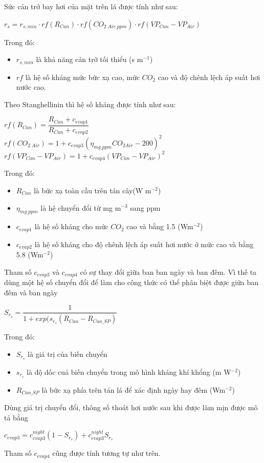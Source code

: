 \documentclass[a4paper]{article}
\begin{document}
    Sức cản trở bay hơi của mặt trên lá được tính như sau:
    \begin{center}
        $r_s = r_{s, min} \cdot rf(R_{Can}) \cdot rf(CO_{2\;Air\_ppm}) \cdot 
        rf(VP_{Can} - VP_{Air})$
    \end{center}
    Trong đó:
    \begin{itemize}
        \item $r_{s, min}$ là khả năng cản trở tối thiểu  (s m$^{-1}$)
        \item $rf$ là hệ số kháng mức bức xạ cao, mức $CO_2$ cao và độ chênh lệch áp suất hơi nước cao.
    \end{itemize}
    
    Theo Stanghellinin thì hệ số kháng được tính như sau:
    \begin{center}
        $rf(R_{Can}) = \dfrac{R_{Can} + c_{evap1}}{R_{Can} + c_{evap2}}$\\
        $rf(CO_{2\;Air}) = 1 + c_{evap3}(\eta_{mg\_ppm}CO_{2Air} - 200)^2$\\
        $rf(VP_{Can} - VP_{Air}) = 1 + c_{evap4}(VP_{Can} - VP_{Air})^2$ 
    \end{center}
    Trong đó:
    \begin{itemize}
        \item $R_{Can}$ là bức xạ toàn cầu trên tán cây(W m$^{-2}$)
        \item $\eta_{mg\_ppm}$ là hệ chuyển đổi từ mg m$^{-3}$ sang ppm
        \item $c_{evap1}$ là hệ số kháng cho mức $CO_2$ cao và bằng 1.5 (Wm$^{-2}$)
        \item $c_{evap2}$ là hệ số kháng cho độ chênh lệch áp suất hơi nước ở mức cao và bằng 5.8 (Wm$^{-2}$)
    \end{itemize}
    
    Tham số $c_{evap3}$ và $c_{evap4}$ có sự thay đổi giữa ban ban ngày và ban đêm. Vì thế ta dùng một hệ số chuyển đổi để làm cho công thức có thể phân biệt được giữa ban đêm và ban ngày
    \begin{center}
        $S_{r_s} = \dfrac{1}{1 + exp(s_{r_s}(R_{Can} - R_{Can\_SP})}$
    \end{center}
    Trong đó:
    \begin{itemize}
        \item $S_{r_s}$ là giá trị của biến chuyển
        \item $s_{r_s}$ là độ dốc cuả biến chuyển trong mô hình kháng khí khổng
        (m W$^{-2}$) 
        \item $R_{Can\_SP}$ là bức xạ phía trên tán lá để xác định ngày hay đêm (Wm$^{-2}$)
    \end{itemize}
    Dùng giá trị chuyển đổi, thông số thoát hơi nước sau khi được làm mịn được mô tả bằng
    \begin{center}
        $c_{evap3} = c^{night}_{evap3}(1 - S_{r_s}) + c^{night}_{evap3}S_{r_s}$
    \end{center}
    Tham số $c_{evap4}$ cũng được tính tương tự như trên.
    
\end{document}

